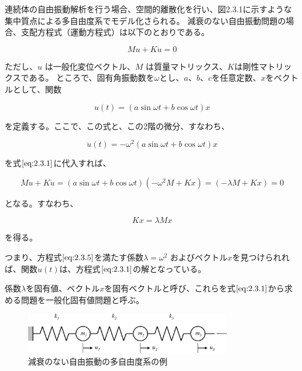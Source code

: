 \documentclass[a4paper,pandoc,ja=standard]{bxjsarticle}
\begin{document}
連続体の自由振動解析を行う場合、空間的離散化を行い、図2.3.1に示すような集中質点による多自由度系でモデル化さられる。
減衰のない自由振動問題の場合、支配方程式（運動方程式）は以下のとおりである。

\begin{equation}
M u + K \ddot{u} = 0
\label{eq:2.3.1}
\end{equation}

ただし、\(u\) は一般化変位ベクトル、\(M\) は質量マトリックス、\(K\)は剛性マトリックスである。
ところで、固有角振動数を\(\omega\)とし、\(a\)、\(b\)、\(c\)を任意定数、\(x\)をベクトルとして、関数

\begin{equation}
u(t) = (a \sin \omega t + b \cos \omega t ) x
\label{eq:2.3.2}
\end{equation}

を定義する。ここで、この式と、この2階の微分、すなわち、

\begin{equation}
\ddot{u}(t) = -\omega^2 (a \sin \omega t + b \cos \omega t) x
\label{eq:2.3.3}
\end{equation}

を式\(\eqref{eq:2.3.1}\)に代入すれば、

\begin{equation}
M u + K \ddot{u} = (a \sin \omega t + b \cos \omega t) (- \omega^2 M + K x ) =  ( -\lambda M + K x) = 0
\label{eq:2.3.4}
\end{equation}

となる。すなわち、

\begin{equation}
K x = \lambda M x
\label{eq:2.3.5}
\end{equation}

を得る。

つまり、方程式\(\eqref{eq:2.3.5}\)を満たす係数\(\lambda = \omega^2\)
およびベクトル\(x\)を見つけられれば、関数\(u(t)\)は、方程式\(\eqref{eq:2.3.1}\)の解となっている。

係数\(\lambda\)を固有値、ベクトル\(x\)を固有ベクトルと呼び、これらを式\(\eqref{eq:2.3.1}\)から求める問題を一般化固有値問題と呼ぶ。

\begin{figure}
\centering
\includegraphics[width=0.8\textwidth,height=\textheight]{media/theory05_01.png}
\caption{減衰のない自由振動の多自由度系の例}
\end{figure}
\end{document}
